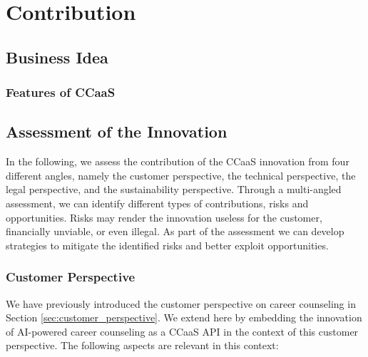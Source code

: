 \section{Contribution}
\label{sec:contribution}

\subsection{Business Idea}

\subsubsection{Features of CCaaS}



\subsection{Assessment of the Innovation}

In the following, we assess the contribution of the CCaaS innovation from four different angles, namely the
customer perspective, the technical perspective, the legal perspective, and the sustainability perspective.
Through a multi-angled assessment, we can identify different types of contributions, risks and opportunities.
Risks may render the innovation useless for the customer, financially unviable, or even illegal. As part of
the assessment we can develop strategies to mitigate the identified risks and better exploit opportunities.

\subsubsection{Customer Perspective}

We have previously introduced the customer perspective on career counseling in Section \ref{sec:customer_perspective}.
We extend here by embedding the innovation of AI-powered career counseling as a CCaaS API in the context of this 
customer perspective. The following aspects are relevant in this context:

